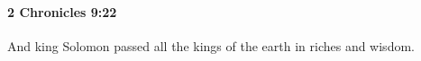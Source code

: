 
		\paragraph{2 Chronicles 9:22} %
			\label{2CHRONICLES-9-22}

			And king Solomon passed all the kings of the earth in riches and wisdom.


